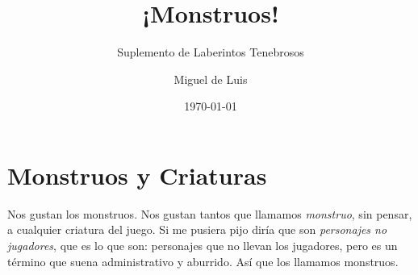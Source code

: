 



\title{¡Monstruos!}
\subtitle{Suplemento de Laberintos Tenebrosos}
\author{Miguel de Luis}
\date{\today}
\maketitle

\section{Monstruos y Criaturas}

Nos gustan los monstruos. Nos gustan tantos que llamamos \emph{monstruo}, sin
pensar, a cualquier criatura del juego. Si me pusiera pijo diría que son
\emph{personajes no jugadores}, que es lo que son: personajes que no llevan los
jugadores, pero es un término que suena administrativo y aburrido. Así que los
llamamos monstruos.

